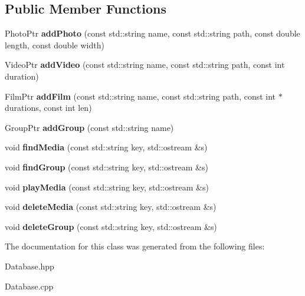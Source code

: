 \subsection*{Public Member Functions}
\begin{DoxyCompactItemize}
\item 
\mbox{\label{class_database_a3982f27a56e988a32f0214cebeeab06e}} 
Photo\+Ptr {\bfseries add\+Photo} (const std\+::string name, const std\+::string path, const double length, const double width)
\item 
\mbox{\label{class_database_a5526f474e8420d4897901397ea63c643}} 
Video\+Ptr {\bfseries add\+Video} (const std\+::string name, const std\+::string path, const int duration)
\item 
\mbox{\label{class_database_a3993bbc6d19dc7efc12981307f9b738e}} 
Film\+Ptr {\bfseries add\+Film} (const std\+::string name, const std\+::string path, const int $\ast$durations, const int len)
\item 
\mbox{\label{class_database_af84f62779188964e309e161c7bf3bf0c}} 
Group\+Ptr {\bfseries add\+Group} (const std\+::string name)
\item 
\mbox{\label{class_database_a8030fb643da67de36b7560faf3dc9efe}} 
void {\bfseries find\+Media} (const std\+::string key, std\+::ostream \&s)
\item 
\mbox{\label{class_database_ab21b31c38dbd80273688ed3b4584cff2}} 
void {\bfseries find\+Group} (const std\+::string key, std\+::ostream \&s)
\item 
\mbox{\label{class_database_a8f80c123a80742680318f55bfa9a929e}} 
void {\bfseries play\+Media} (const std\+::string key, std\+::ostream \&s)
\item 
\mbox{\label{class_database_aa5e19b1140c4ac493674b7654b3f8cb8}} 
void {\bfseries delete\+Media} (const std\+::string key, std\+::ostream \&s)
\item 
\mbox{\label{class_database_a18edec0c6894b0656cf50f741a670dd4}} 
void {\bfseries delete\+Group} (const std\+::string key, std\+::ostream \&s)
\end{DoxyCompactItemize}


The documentation for this class was generated from the following files\+:\begin{DoxyCompactItemize}
\item 
Database.\+hpp\item 
Database.\+cpp\end{DoxyCompactItemize}

